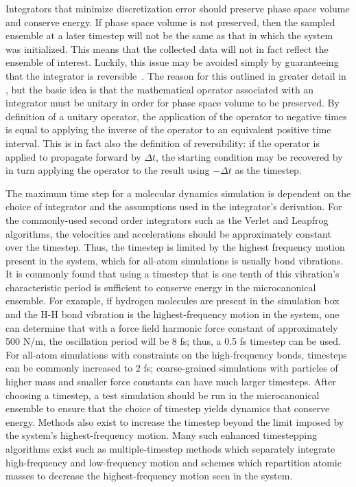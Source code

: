\documentclass[9pt,bestpractices]{livecoms}
\begin{document}
Integrators that minimize discretization error should preserve phase space volume and conserve energy.
If phase space volume is not preserved, then the sampled ensemble at a later timestep will not be the same as that in which the system was initialized.
This means that the collected data will not in fact reflect the ensemble of interest.
Luckily, this issue may be avoided simply by guaranteeing that the integrator is reversible~\cite{Frenkel:2001:}.
The reason for this outlined in greater detail in , but the basic idea is that the mathematical operator associated with an integrator must be unitary in order for phase space volume to be preserved.
By definition of a unitary operator, the application of the operator to negative times is equal to applying the inverse of the operator to an equivalent positive time interval.
This is in fact also the definition of reversibility: if the operator is applied to propagate forward by $\Delta t$, the starting condition may be recovered by in turn applying the operator to the result using $- \Delta t$ as the timestep.

The maximum time step for a molecular dynamics simulation is dependent on the choice of integrator and the assumptions used in the integrator's derivation.
For the commonly-used second order integrators such as the Verlet and Leapfrog algorithms, the velocities and accelerations should be approximately constant over the timestep.
Thus, the timestep is limited by the highest frequency motion present in the system, which for all-atom simulations is usually bond vibrations.
It is commonly found that using a timestep that is one tenth of this vibration's characteristic period is sufficient to conserve energy in the microcanonical ensemble.
For example, if hydrogen molecules are present in the simulation box and the H-H bond vibration is the highest-frequency motion in the system, one can determine that with a force field harmonic force constant of approximately 500 N/m, the oscillation period will be 8 fs; thus, a 0.5 fs timestep can be used.
For all-atom simulations with constraints on the high-frequency bonds, timesteps can be commonly increased to 2 fs; coarse-grained simulations with particles of higher mass and smaller force constants can have much larger timesteps.
After choosing a timestep, a test simulation should be run in the microcanonical ensemble to ensure that the choice of timestep yields dynamics that conserve energy.
Methods also exist to increase the timestep beyond the limit imposed by the system's highest-frequency motion.
Many such enhanced timestepping algorithms exist such as multiple-timestep methods which separately integrate high-frequency and low-frequency motion and schemes which repartition atomic masses to decrease the highest-frequency motion seen in the system\cite{Berne:1999:Molecular,Hopkins:2015:JCTC:Long}.
\end{document}
